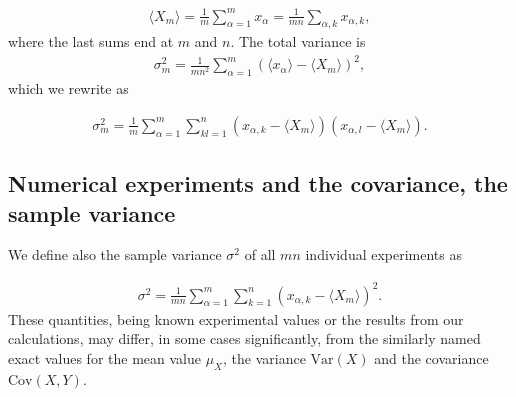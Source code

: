 \documentclass[letterpaper,10pt,english]{sphinxmanual}
\begin{document}
\begin{equation*}
\begin{split}
\begin{equation}
\langle X_m \rangle= \frac{1}{m}\sum_{\alpha=1}^mx_{\alpha}=\frac{1}{mn}\sum_{\alpha, k} x_{\alpha,k},
\label{eq:exptmean} \tag{6}
\end{equation}
\end{split}
\end{equation*}
where the last sums end at \(m\) and \(n\).
The total variance is
\begin{equation*}
\begin{split}
\sigma^2_m= \frac{1}{mn^2}\sum_{\alpha=1}^m(\langle x_{\alpha} \rangle-\langle X_m \rangle)^2,
\end{split}
\end{equation*}
which we rewrite as




\begin{equation*}
\begin{split}
\begin{equation}
\sigma^2_m=\frac{1}{m}\sum_{\alpha=1}^m\sum_{kl=1}^n (x_{\alpha,k}-\langle X_m \rangle)(x_{\alpha,l}-\langle X_m \rangle).
\label{eq:exptvariance} \tag{7}
\end{equation}
\end{split}
\end{equation*}

\subsection{Numerical experiments and the covariance, the sample variance}
\label{\detokenize{chapter3:numerical-experiments-and-the-covariance-the-sample-variance}}
We define also the sample variance \(\sigma^2\) of all \(mn\) individual experiments as




\begin{equation*}
\begin{split}
\begin{equation}
\sigma^2=\frac{1}{mn}\sum_{\alpha=1}^m\sum_{k=1}^n (x_{\alpha,k}-\langle X_m \rangle)^2.
\label{eq:sampleexptvariance} \tag{8}
\end{equation}
\end{split}
\end{equation*}
These quantities, being known experimental values or the results from our calculations,
may differ, in some cases
significantly,  from the similarly named
exact values for the mean value \(\mu_X\), the variance \(\mathrm{Var}(X)\)
and the covariance \(\mathrm{Cov}(X,Y)\).
\end{document}
